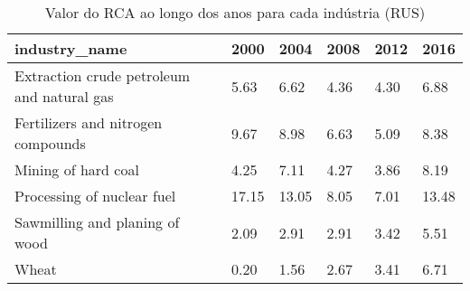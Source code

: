 \begin{table}
\centering
\caption{Valor do RCA ao longo dos anos para cada indústria (RUS)}
\begin{tabular}{p{6cm}p{1.5cm}p{1.5cm}p{1.5cm}p{1.5cm}p{1.5cm}}
\toprule
                             industry\_name &  2000 &  2004 & 2008 & 2012 &  2016 \\
\midrule
Extraction crude petroleum and natural gas &  5.63 &  6.62 & 4.36 & 4.30 &  6.88 \\
        Fertilizers and nitrogen compounds &  9.67 &  8.98 & 6.63 & 5.09 &  8.38 \\
                       Mining of hard coal &  4.25 &  7.11 & 4.27 & 3.86 &  8.19 \\
                Processing of nuclear fuel & 17.15 & 13.05 & 8.05 & 7.01 & 13.48 \\
            Sawmilling and planing of wood &  2.09 &  2.91 & 2.91 & 3.42 &  5.51 \\
                                     Wheat &  0.20 &  1.56 & 2.67 & 3.41 &  6.71 \\
\bottomrule
\end{tabular}
\end{table}

